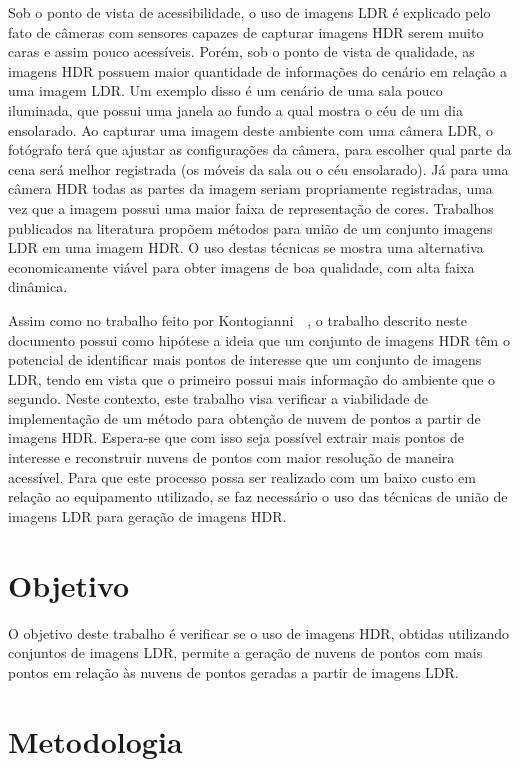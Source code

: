 Sob o ponto de vista de acessibilidade, o uso de imagens LDR é explicado pelo fato de câmeras com sensores capazes de capturar imagens HDR serem muito caras e assim pouco acessíveis. Porém, sob o ponto de vista de qualidade, as imagens HDR possuem maior quantidade de informações do cenário em relação a uma imagem LDR. Um exemplo disso é um cenário de uma sala pouco iluminada, que possui uma janela ao fundo a qual mostra o céu de um dia ensolarado. Ao capturar uma imagem deste ambiente com uma câmera LDR, o fotógrafo terá que ajustar as configurações da câmera, para escolher qual parte da cena será melhor registrada (os móveis da sala ou o céu ensolarado). Já para uma câmera HDR todas as partes da imagem seriam propriamente registradas, uma vez que a imagem possui uma maior faixa de representação de cores. Trabalhos publicados na literatura propõem métodos para união de um conjunto imagens LDR em uma imagem HDR. O uso destas técnicas se mostra uma alternativa economicamente viável para obter imagens de boa qualidade, com alta faixa dinâmica.


Assim como no trabalho feito por Kontogianni~\etal~\cite{hdr3d}, o trabalho descrito neste documento possui como hipótese a ideia que um conjunto de imagens HDR têm o potencial de identificar mais pontos de interesse que um conjunto de imagens LDR, tendo em vista que o primeiro possui mais informação do ambiente que o segundo. Neste contexto, este trabalho visa verificar a viabilidade de implementação de um método para obtenção de nuvem de pontos a partir de imagens HDR. Espera-se que com isso seja possível extrair mais pontos de interesse e reconstruir nuvens de pontos com maior resolução de maneira acessível. Para que este processo possa ser realizado com um baixo custo em relação ao equipamento utilizado, se faz necessário o uso das técnicas de união de imagens LDR para geração de imagens HDR.

\section{Objetivo} \label{introducaoObjetivo}

O objetivo deste trabalho é verificar se o uso de imagens HDR, obtidas utilizando conjuntos de imagens LDR, permite a geração de nuvens de pontos com mais pontos em relação às nuvens de pontos geradas a partir de imagens LDR.

\section{Metodologia} \label{introducaoMetodo}

